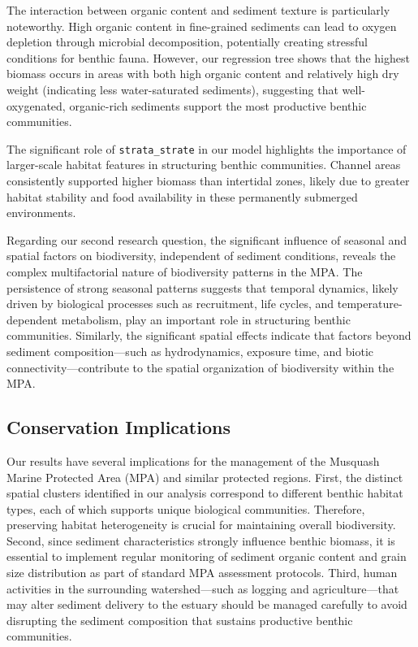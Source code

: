\documentclass[12pt]{article}
\begin{document}
\qquad The interaction between organic content and sediment texture is
particularly noteworthy. High organic content in fine-grained sediments can lead
to oxygen depletion through microbial decomposition, potentially creating
stressful conditions for benthic fauna. However, our regression tree shows that
the highest biomass occurs in areas with both high organic content and
relatively high dry weight (indicating less water-saturated sediments),
suggesting that well-oxygenated, organic-rich sediments support the most
productive benthic communities.

\qquad The significant role of \texttt{strata\_strate} in our model highlights
the importance of larger-scale habitat features in structuring benthic
communities. Channel areas consistently supported higher biomass than intertidal
zones, likely due to greater habitat stability and food availability in these
permanently submerged environments.

\qquad Regarding our second research question, the significant influence of
seasonal and spatial factors on biodiversity, independent of sediment
conditions, reveals the complex multifactorial nature of biodiversity patterns
in the MPA. The persistence of strong seasonal patterns suggests that temporal
dynamics, likely driven by biological processes such as recruitment, life
cycles, and temperature-dependent metabolism, play an important role in
structuring benthic communities. Similarly, the significant spatial effects
indicate that factors beyond sediment composition—such as hydrodynamics,
exposure time, and biotic connectivity—contribute to the spatial organization of
biodiversity within the MPA.

\subsection{Conservation Implications}

\qquad Our results have several implications for the management of the Musquash
Marine Protected Area (MPA) and similar protected regions. First, the distinct
spatial clusters identified in our analysis correspond to different benthic
habitat types, each of which supports unique biological communities. Therefore,
preserving habitat heterogeneity is crucial for maintaining overall
biodiversity. Second, since sediment characteristics strongly influence benthic
biomass, it is essential to implement regular monitoring of sediment organic
content and grain size distribution as part of standard MPA assessment
protocols. Third, human activities in the surrounding watershed—such as logging
and agriculture—that may alter sediment delivery to the estuary should be
managed carefully to avoid disrupting the sediment composition that sustains
productive benthic communities.
\end{document}
